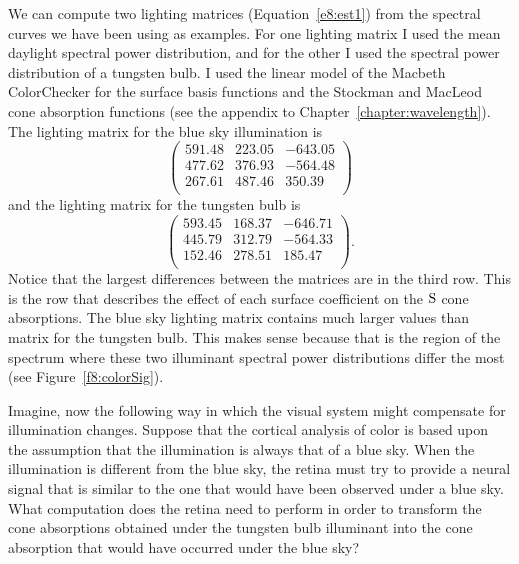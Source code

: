 We can compute two lighting matrices (Equation~\ref{e8:est1}) from the
spectral curves we have been using as examples.  For one lighting
matrix I used the mean daylight spectral power distribution, and for
the other I used the spectral power distribution of a tungsten
bulb.  I used the linear model of the Macbeth ColorChecker for the
surface basis functions and the Stockman and MacLeod cone absorption
functions (see the appendix to Chapter~\ref{chapter:wavelength}).  The
lighting matrix for the blue sky illumination is
\begin{equation}
 \left (
 \begin{array}{ccc}
  591.48&  223.05 & -643.05 \\
  477.62 & 376.93 & -564.48 \\
  267.61 & 487.46 &  350.39 \\
 \end{array}
 \right ) \nonumber
\end{equation}
and the lighting matrix for the tungsten bulb is
\begin{equation}
 \left (
 \begin{array}{ccc}
  593.45 & 168.37 & -646.71 \\
  445.79 & 312.79 & -564.33 \\
  152.46 & 278.51 &  185.47 \\
 \end{array}
 \right ) . \nonumber
\end{equation}
Notice that the largest differences between the matrices are in the
third row.  This is the row that describes the effect of each surface
coefficient on the $\mbox{S}$ cone absorptions.  The blue sky lighting
matrix contains much larger values than matrix for the tungsten
bulb.  This makes sense because that is the region of the spectrum
where these two illuminant spectral power distributions differ the
most (see Figure~\ref{f8:colorSig}).

Imagine, now the following way in which the visual system might
compensate for illumination changes.  Suppose that the cortical
analysis of color is based upon the assumption that the illumination
is always that of a blue sky.  When the illumination is different from
the blue sky, the retina must try to provide a neural signal that is
similar to the one that would have been observed under a blue sky.
What computation does the retina need to perform in order to transform
the cone absorptions obtained under the tungsten bulb illuminant
into the cone absorption that would have occurred under the blue sky?  

